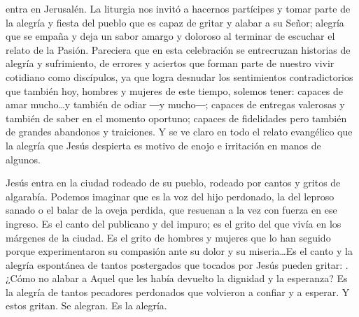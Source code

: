\begin{body}
 entra en Jerusalén. La liturgia nos invitó a hacernos partícipes y tomar parte de la alegría y fiesta del pueblo que es capaz de gritar y alabar a su Señor; alegría que se empaña y deja un sabor amargo y doloroso al terminar de escuchar el relato de la Pasión. Pareciera que en esta celebración se entrecruzan historias de alegría y sufrimiento, de errores y aciertos que forman parte de nuestro vivir cotidiano como discípulos, ya que logra desnudar los sentimientos contradictorios que también hoy, hombres y mujeres de este tiempo, solemos tener: capaces de amar mucho\ldots y también de odiar ―y mucho―; capaces de entregas valerosas y también de saber  en el momento oportuno; capaces de fidelidades pero también de grandes abandonos y traiciones. Y se ve claro en todo el relato evangélico que la alegría que Jesús despierta es motivo de enojo e irritación en manos de algunos.

Jesús entra en la ciudad rodeado de su pueblo, rodeado por cantos y gritos de algarabía. Podemos imaginar que es la voz del hijo perdonado, la del leproso sanado o el balar de la oveja perdida, que resuenan a la vez con fuerza en ese ingreso. Es el canto del publicano y del impuro; es el grito del que vivía en los márgenes de la ciudad. Es el grito de hombres y mujeres que lo han seguido porque experimentaron su compasión ante su dolor y su miseria\ldots Es el canto y la alegría espontánea de tantos postergados que tocados por Jesús pueden gritar: . ¿Cómo no alabar a Aquel que les había devuelto la dignidad y la esperanza? Es la alegría de tantos pecadores perdonados que volvieron a confiar y a esperar. Y estos gritan. Se alegran. Es la alegría.


\end{body}
